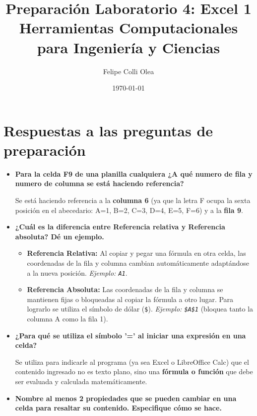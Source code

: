 \documentclass[11pt]{article}
\title{Preparación Laboratorio 4: Excel 1 \\ \large{Herramientas Computacionales para Ingeniería y Ciencias}}
\author{Felipe Colli Olea}
\date{\today}
\begin{document}
\maketitle
\thispagestyle{fancy}

\section*{Respuestas a las preguntas de preparación}

\begin{itemize}
    
    \item[\textbf{a)}] \textbf{Para la celda F9 de una planilla cualquiera ¿A qué numero de fila y numero de columna se está haciendo referencia?}
    
    Se está haciendo referencia a la \textbf{columna 6} (ya que la letra F ocupa la sexta posición en el abecedario: A=1, B=2, C=3, D=4, E=5, F=6) y a la \textbf{fila 9}.

    \vspace{0.3cm}
    \item[\textbf{b)}] \textbf{¿Cuál es la diferencia entre Referencia relativa y Referencia absoluta? Dé un ejemplo.}
    
    \begin{itemize}
        \item \textbf{Referencia Relativa:} Al copiar y pegar una fórmula en otra celda, las coordenadas de la fila y columna cambian automáticamente adaptándose a la nueva posición. \textit{Ejemplo: \texttt{A1}}.
        \item \textbf{Referencia Absoluta:} Las coordenadas de la fila y columna se mantienen fijas o bloqueadas al copiar la fórmula a otro lugar. Para lograrlo se utiliza el símbolo de dólar (\texttt{\$}). \textit{Ejemplo: \texttt{\$A\$1}} (bloquea tanto la columna A como la fila 1).
    \end{itemize}

    \vspace{0.3cm}
    \item[\textbf{c)}] \textbf{¿Para qué se utiliza el símbolo '=' al iniciar una expresión en una celda?}
    
    Se utiliza para indicarle al programa (ya sea Excel o LibreOffice Calc) que el contenido ingresado no es texto plano, sino una \textbf{fórmula o función} que debe ser evaluada y calculada matemáticamente.

    \vspace{0.3cm}
    \item[\textbf{d)}] \textbf{Nombre al menos 2 propiedades que se pueden cambiar en una celda para resaltar su contenido. Especifique cómo se hace.}
    

\end{itemize}
\end{document}

